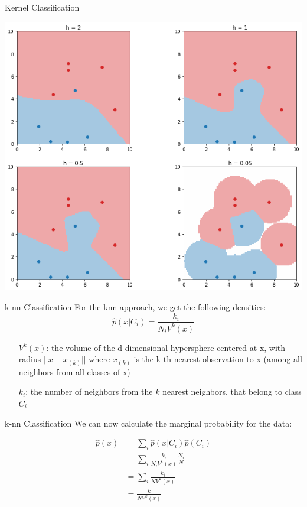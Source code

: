 \documentclass{beamer}
\begin{document}
\begin{frame}[fragile]{Kernel Classification}
\begin{center}
  \includegraphics[height=0.9\textheight]{images/classification_kernel.png}
\end{center}
\end{frame}


\begin{frame}[fragile]{k-nn Classification}	
For the knn approach, we get the following densities:
	\begin{equation}
		\hat p(x|C_{i})=\frac{k_{i}}{N_{i}V^{k}(x)}
	\end{equation} 		
  
\begin{enumerate}[\hspace{2cm}]
  \item[$V^{k}(x)$:] the volume of the d-dimensional hypersphere centered
  at x, with radius $||x-x_{(k)}||$ where $x_{(k)}$ is the k-th nearest observation
  to x (among all neighbors from all classes of x)
  \item[$k_i$:] the number of neighbors from the $k$ nearest neighbors, that belong to class $C_i$
\end{enumerate}	
\end{frame}


\begin{frame}[fragile]{k-nn Classification}
	We can now calculate the marginal probability for the data:
  
  \begin{align}
    \hat p(x) &= \sum_i \hat p(x | C_i) \hat p(C_i)\\
              &= \sum_i \frac{k_{i}}{N_{i}V^{k}(x)} \frac{N_i}{N}\\
              &= \sum_i \frac{k_{i}}{NV^{k}(x)}\\
              &= \frac{k}{NV^{k}(x)}
  \end{align}
\end{frame}
\end{document}
